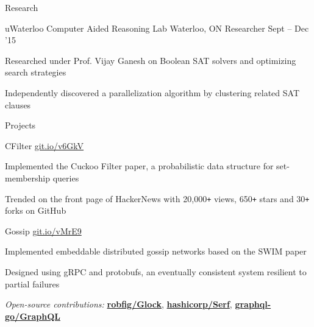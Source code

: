\documentclass{resume} %
\begin{document}

\begin{rSection}{Research}
  \begin{rSubsection}{uWaterloo Computer Aided Reasoning Lab}
                     {Waterloo, ON}
                     {Researcher}
                     {Sept -- Dec '15}
    \item Researched under Prof. Vijay Ganesh on Boolean SAT solvers and
      optimizing search strategies
    \item Independently discovered a parallelization algorithm by clustering
      related SAT clauses
  \end{rSubsection}
\end{rSection}


\begin{rSection}{Projects}
  \begin{rSubsection}{CFilter}
                     {\href{https://git.io/v6GkV}{git.io/v6GkV}}
                     {}{}

    \item Implemented the Cuckoo Filter paper, a probabilistic data structure for
      set-membership queries
    \item Trended on the front page of HackerNews with 20,000\texttt{+} views,
      650\texttt{+} stars and 30\texttt{+} forks on GitHub
  \end{rSubsection}

  \begin{rSubsection}{Gossip}
                     {\href{https://git.io/vMrE9}{git.io/vMrE9}}
                     {}{}

    \item Implemented embeddable distributed gossip networks based on the SWIM
      paper
    \item Designed using gRPC and protobufs, an eventually consistent system
      resilient to partial failures
  \end{rSubsection}

  \begin{rMinisection}
    \item {\em Open-source contributions:}
      \href{https://github.com/robfig/glock}{\textbf{robfig/Glock}},
      \href{https://github.com/hashicorp/serf}{\textbf{hashicorp/Serf}},
      \href{https://github.com/graphql-go/graphql}{\textbf{graphql-go/GraphQL}}
  \end{rMinisection}
\end{rSection}
\end{document}
